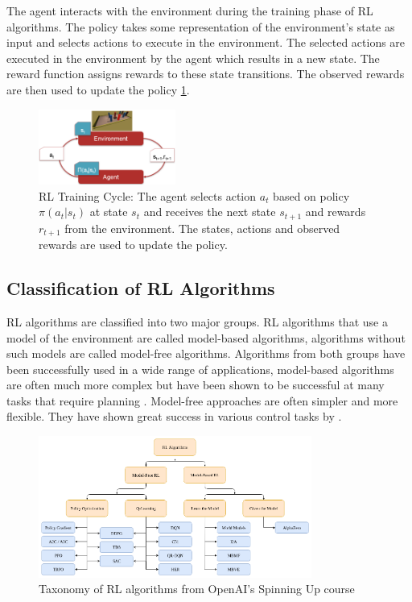 The agent interacts with the environment during the training phase of RL algorithms. The policy takes some representation of the environment's state as input and selects actions to execute in the environment. The selected actions are executed in the environment by the agent which results in a new state. The reward function assigns rewards to these state transitions.
The observed rewards are then used to update the policy \ref{fig:rlcycle}.

\begin{figure}
    \centering
    \includegraphics[width=0.4\textwidth]{Bilder/rl_cycle.png}
    \caption{RL Training Cycle: The agent selects action $a_t$ based on policy $\pi(a_t|s_t)$ at state $s_t$ and receives the next state $s_{t+1}$ and rewards $r_{t+1}$ from the environment. The states, actions and observed rewards are used to update the policy.}
    \label{fig:rlcycle}
\end{figure}

\subsection{Classification of \ac{RL} Algorithms}

\ac{RL} algorithms are classified into two major groups. RL algorithms that use a model of the environment are called model-based algorithms, algorithms without such models are called model-free algorithms. Algorithms from both groups have been successfully used in a wide range of applications, model-based algorithms are often much more complex but have been shown to be successful at many tasks that require planning \autocite{alphagoimprovementmuzero}. Model-free approaches are often simpler and more flexible. They have shown great success in various control tasks by \textcite{atari}.

\begin{figure}
    \centering
    \includegraphics[width=0.8\textwidth]{Bilder/openai_spinningup_taxonomy.png}
    \caption{Taxonomy of \ac{RL} algorithms from OpenAI's Spinning Up course \autocite{spinningup}}
\end{figure}

